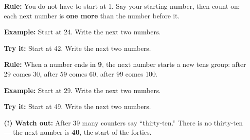 \documentclass[12pt]{article}
\begin{document}


\begin{formulabox}
\textbf{Rule:} You do not have to start at 1. Say your starting number, then
count on: each next number is \textbf{one more} than the number before it.
\end{formulabox}

\begin{examplebox}
\textbf{Example:} \quad Start at 24. Write the next two numbers.
\end{examplebox}

\begin{tryitbox}
\textbf{Try it:} \quad Start at 42. Write the next two numbers.\\[2pt]
\end{tryitbox}


\begin{formulabox}
\textbf{Rule:} When a number ends in \textbf{9}, the next number starts a new
tens group: after 29 comes 30, after 59 comes 60, after 99 comes 100.
\end{formulabox}

\begin{examplebox}
\textbf{Example:} \quad Start at 29. Write the next two numbers.
\end{examplebox}

\begin{tryitbox}
\textbf{Try it:} \quad Start at 49. Write the next two numbers.\\[2pt]
\end{tryitbox}

\begin{watchoutbox}
\textbf{(!) Watch out:} After 39 many counters say ``thirty-ten.'' There is no
thirty-ten --- the next number is \textbf{40}, the start of the forties.
\end{watchoutbox}
\end{document}
